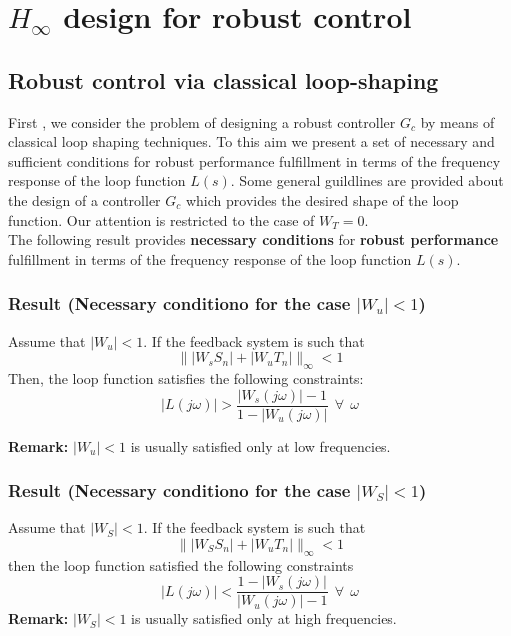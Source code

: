  \chapter{$H_\infty$ design for robust control}

\section{Robust control via classical loop-shaping}
First , we consider the problem of designing a robust controller $G_c$ by means of classical loop shaping techniques. To this aim we present a set of necessary and sufficient conditions for robust performance fulfillment in terms of the frequency response of the loop function $L(s)$. Some general guildlines are provided about the design of a controller $G_c$ which provides the desired shape of the loop function. Our attention is restricted to the case of $W_T = 0$.\\


The following result provides \textbf{necessary conditions} for \textbf{robust performance} fulfillment in terms of the frequency response of the loop function $L(s)$.\\

\subsection{Result (Necessary conditiono for the case $|W_u|< 1$)}

Assume that $|W_u| < 1$. If the feedback system is such that 
\[
\||W_sS_n|+|W_uT_n|\|_\infty < 1
\]
Then, the loop function satisfies the following constraints:
\[
|L(j\omega)| > \frac{|W_s(j\omega)|-1}{1 - |W_u(j\omega)|} \:\:\forall \:\: \omega
\]

\textbf{Remark:} $|W_u| < 1$ is usually satisfied only at low frequencies.\\

\subsection{Result (Necessary conditiono for the case $|W_S|< 1$)}
Assume that $|W_S|<1$. If the feedback system is such that \\
\[
\||W_SS_n|+|W_uT_n|\|_\infty < 1
\]
then the loop function satisfied the following constraints
\[
|L(j\omega)| < \frac{1-|W_s(j\omega)|}{|W_u(j\omega)|-1} \:\:\forall \:\: \omega
\]
\textbf{Remark:} $|W_S| < 1$ is usually satisfied only at high frequencies.\\

